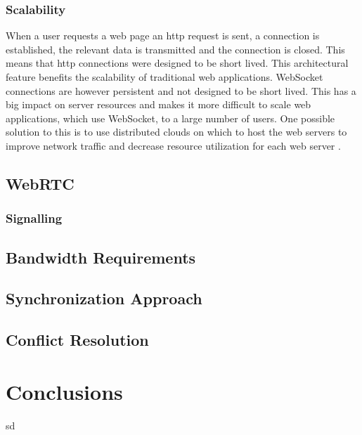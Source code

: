 \documentclass[prodmode,acmtecs]{acmsmall}
\begin{document}
\subsubsection{Scalability}
When a user requests a web page an http request is sent, a connection is established, the relevant data is transmitted and the connection is closed. This means that http connections were designed to be short lived. This architectural feature benefits the scalability of traditional web applications. WebSocket connections are however persistent and not designed to be short lived. This has a big impact on server resources and makes it more difficult to scale web applications, which use WebSocket, to a large number of users. One possible solution to this is to use distributed clouds on which to host the web servers to improve network traffic and decrease resource utilization for each web server \cite{solomon2012distributed}. 






\subsection{WebRTC}

\subsubsection*{Signalling}
\subsection{Bandwidth Requirements}
\subsection{Synchronization Approach}
\subsection{Conflict Resolution}


\section{Conclusions}

sd
\appendix


\end{document}

